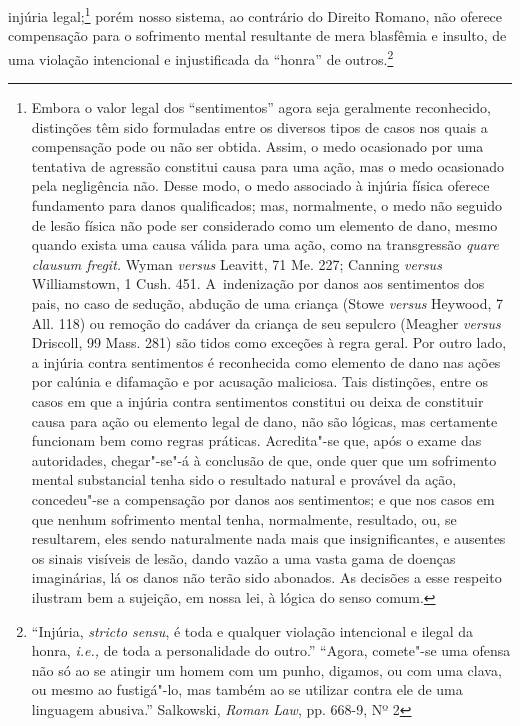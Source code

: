 injúria legal;\footnote{Embora o valor legal dos ``sentimentos'' agora
  seja geralmente reconhecido, distinções têm sido formuladas entre os
  diversos tipos de casos nos quais a compensação pode ou não ser
  obtida. Assim, o medo ocasionado por uma tentativa de agressão
  constitui causa para uma ação, mas o medo ocasionado pela negligência
  não. Desse modo, o medo associado à injúria física oferece fundamento
  para danos qualificados; mas, normalmente, o medo não seguido de lesão
  física não pode ser considerado como um elemento de dano, mesmo quando
  exista uma causa válida para uma ação, como na transgressão
  \emph{quare clausum fregit.} Wyman \emph{versus} Leavitt, 71 Me. 227;
  Canning \emph{versus} Williamstown, 1 Cush. 451. A~indenização por
  danos aos sentimentos dos pais, no caso de sedução, abdução de uma
  criança (Stowe \emph{versus} Heywood, 7 All. 118) ou remoção do
  cadáver da criança de seu sepulcro (Meagher \emph{versus} Driscoll, 99
  Mass. 281) são tidos como exceções à regra geral. Por outro lado, a
  injúria contra sentimentos é reconhecida como elemento de dano nas
  ações por calúnia e difamação e por acusação maliciosa. Tais
  distinções, entre os casos em que a injúria contra sentimentos
  constitui ou deixa de constituir causa para ação ou elemento legal de
  dano, não são lógicas, mas certamente funcionam bem como regras
  práticas. Acredita"-se que, após o exame das autoridades, chegar"-se"-á à
  conclusão de que, onde quer que um sofrimento mental substancial tenha
  sido o resultado natural e provável da ação, concedeu"-se a compensação
  por danos aos sentimentos; e que nos casos em que nenhum sofrimento
  mental tenha, normalmente, resultado, ou, se resultarem, eles sendo
  naturalmente nada mais que insignificantes, e ausentes os sinais
  visíveis de lesão, dando vazão a uma vasta gama de doenças
  imaginárias, lá os danos não terão sido abonados. As decisões a esse
  respeito ilustram bem a sujeição, em nossa lei, à lógica do senso
  comum.} porém nosso sistema, ao contrário do Direito Romano, não
oferece compensação para o sofrimento mental resultante de mera
blasfêmia e insulto, de uma violação intencional e injustificada da
``honra'' de outros.\footnote{``Injúria, \emph{stricto sensu}, é toda e
  qualquer violação intencional e ilegal da honra, \emph{i.e.,} de toda
  a personalidade do outro.'' ``Agora, comete"-se uma ofensa não só ao se
  atingir um homem com um punho, digamos, ou com uma clava, ou mesmo ao
  fustigá"-lo, mas também ao se utilizar contra ele de uma linguagem
  abusiva.'' Salkowski, \emph{Roman Law}, pp. 668-9, Nº 2}

